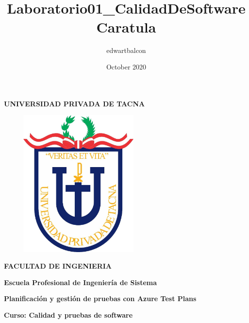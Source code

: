 \documentclass{article}
\title{Laboratorio01_CalidadDeSoftware}
\author{edwartbalcon }
\date{October 2020}
\begin{document}
\title{Caratula}

\begin{titlepage}
\begin{center}
\begin{Large}
\textbf{UNIVERSIDAD PRIVADA DE TACNA} \\
\end{Large}
\vspace*{-0.025in}
\begin{figure}[htb]
\begin{center}
\includegraphics[width=6cm]{./images/logo_UPT}
\end{center}
\end{figure}
\vspace*{-0.025in}
\begin{Large}
\textbf{FACULTAD DE INGENIERIA} \\
\end{Large}
\vspace*{0.05in}
\begin{Large}
\textbf{Escuela Profesional de Ingeniería de Sistema} \\
\end{Large}


\vspace*{0.4in}

\vspace*{0.1in}
\begin{Large}
\textbf{
Planificación y gestión de pruebas con Azure Test Plans} \\
\end{Large}

\vspace*{0.3in}
\begin{Large}
\textbf{Curso: Calidad y pruebas de software} \\
\end{Large}


\end{center}
\end{titlepage}
\end{document}
